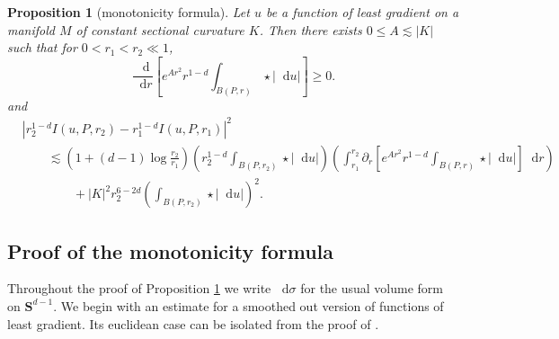\documentclass[final,12pt, leqno]{brownthesis}
\newcommand{\Sph}{\mathbf S}
\newcommand*\dif{\mathop{}\!\mathrm{d}}
\newtheorem{proposition}[theorem]{Proposition}
\theoremstyle{definition}
\numberwithin{equation}{section}
\begin{document}
\begin{proposition}[monotonicity formula]\label{Monotone}
Let $u$ be a function of least gradient on a manifold $M$ of constant sectional curvature $K$.
Then there exists $0 \leq A \lesssim |K|$ such that for $0 < r_1 < r_2 \ll 1$,
\begin{equation}\label{weak monotonicity}
\frac{\dif}{\dif r}\left[e^{Ar^2}r^{1 - d} \int_{B(P, r)} \star |\dif u|\right] \geq 0.
\end{equation}
and
\begin{align*}
&|r_2^{1 - d} I(u, P, r_2) - r_1^{1 - d} I(u, P, r_1)|^2 \\
&\qquad \lesssim \left(1 + (d - 1) \log \frac{r_2}{r_1}\right) \left(r_2^{1 - d}\int_{B(P, r_2)} \star |\dif u| \right)
\left(\int_{r_1}^{r_2} \partial_r \left[e^{Ar^2} r^{1 - d} \int_{B(P, r)} \star |\dif u|\right] \dif r\right)\\
&\qquad \qquad + |K|^2 r_2^{6-2d} \left(\int_{B(P, r_2)} \star |\dif u|\right)^2.
\end{align*}
\end{proposition}

\subsection{Proof of the monotonicity formula}
Throughout the proof of Proposition \ref{Monotone} we write $\dif \sigma$ for the usual volume form on $\Sph^{d - 1}$.
We begin with an estimate for a smoothed out version of functions of least gradient.
Its euclidean case can be isolated from the proof of \cite[Lemma 5.8]{Giusti77}.
\end{document}
